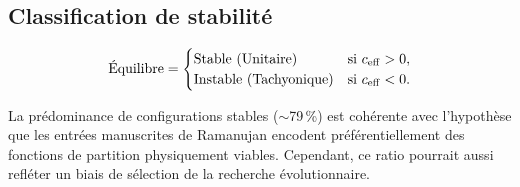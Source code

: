 \subsection{Classification de stabilité}
\begin{equation}
  \text{Équilibre} = \begin{cases} \text{Stable (Unitaire)} & \text{si } c_{\mathrm{eff}} > 0, \\ \text{Instable (Tachyonique)} & \text{si } c_{\mathrm{eff}} < 0. \end{cases}
\end{equation}

\begin{remark}
La prédominance de configurations stables ($\sim$79\,\%) est cohérente avec l'hypothèse que les entrées manuscrites de Ramanujan encodent préférentiellement des fonctions de partition physiquement viables. Cependant, ce ratio pourrait aussi refléter un biais de sélection de la recherche évolutionnaire.
\end{remark}
